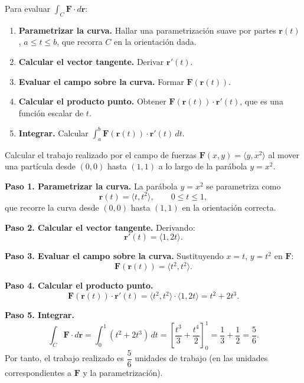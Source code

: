 \begin{pasos}
Para evaluar $\displaystyle \int_C \mathbf{F} \cdot d\mathbf{r}$:
\begin{enumerate}
    \item \textbf{Parametrizar la curva.} Hallar una parametrización
    suave por partes $\mathbf{r}(t)$, $a \le t \le b$, que recorra $C$
    en la orientación dada.
    \item \textbf{Calcular el vector tangente.} Derivar $\mathbf{r}' (t)$.
    \item \textbf{Evaluar el campo sobre la curva.} Formar
    $\mathbf{F}(\mathbf{r}(t))$.
    \item \textbf{Calcular el producto punto.} Obtener
    $\mathbf{F}(\mathbf{r}(t)) \cdot \mathbf{r}'(t)$, que es una
    función escalar de $t$.
    \item \textbf{Integrar.} Calcular $\displaystyle \int_a^b
    \mathbf{F}(\mathbf{r}(t)) \cdot \mathbf{r}'(t) \, dt$.
\end{enumerate}
\end{pasos}

\begin{example}
Calcular el trabajo realizado por el campo de fuerzas
$\mathbf{F}(x,y) = \langle y, x^2 \rangle$ al mover una partícula desde
$(0,0)$ hasta $(1,1)$ a lo largo de la parábola $y=x^2$.
\begin{myproof}
\textbf{Paso 1. Parametrizar la curva.}
La parábola $y=x^2$ se parametriza como
\[
\mathbf{r}(t) = \langle t, t^2 \rangle, \qquad 0 \le t \le 1,
\]
que recorre la curva desde $(0,0)$ hasta $(1,1)$ en la orientación
correcta.

\textbf{Paso 2. Calcular el vector tangente.}
Derivando:
\[
\mathbf{r}'(t) = \langle 1, 2t \rangle.
\]

\textbf{Paso 3. Evaluar el campo sobre la curva.}
Sustituyendo $x=t$, $y=t^2$ en $\mathbf{F}$:
\[
\mathbf{F}(\mathbf{r}(t)) = \langle t^2, t^2 \rangle.
\]

\textbf{Paso 4. Calcular el producto punto.}
\[
\mathbf{F}(\mathbf{r}(t)) \cdot \mathbf{r}'(t)
= \langle t^2, t^2 \rangle \cdot \langle 1, 2t \rangle
= t^2 + 2t^3.
\]

\textbf{Paso 5. Integrar.}
\[
\int_C \mathbf{F} \cdot d\mathbf{r}
= \int_0^1 (t^2 + 2t^3) \, dt
= \left[ \frac{t^3}{3} + \frac{t^4}{2} \right]_0^1
= \frac{1}{3} + \frac{1}{2} = \frac{5}{6}.
\]
Por tanto, el trabajo realizado es $\boxed{\dfrac{5}{6}}$ unidades de
trabajo (en las unidades correspondientes a $\mathbf{F}$ y la
parametrización).
\end{myproof}
\end{example}

